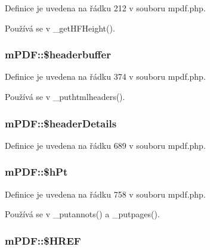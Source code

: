Definice je uvedena na řádku 212 v souboru mpdf.\-php.



Používá se v \-\_\-get\-H\-F\-Height().

\hypertarget{classm_p_d_f_ade2a892a970b5afb921da08cdeb1877e}{
\subsubsection[{\$headerbuffer}]{\setlength{\rightskip}{0pt plus 5cm}m\-P\-D\-F\-::\$headerbuffer}}\label{classm_p_d_f_ade2a892a970b5afb921da08cdeb1877e}


Definice je uvedena na řádku 374 v souboru mpdf.\-php.



Používá se v \-\_\-puthtmlheaders().

\hypertarget{classm_p_d_f_aa8fe296e3fda62d2f405586fe3185ab2}{
\subsubsection[{\$header\-Details}]{\setlength{\rightskip}{0pt plus 5cm}m\-P\-D\-F\-::\$header\-Details}}\label{classm_p_d_f_aa8fe296e3fda62d2f405586fe3185ab2}


Definice je uvedena na řádku 689 v souboru mpdf.\-php.

\hypertarget{classm_p_d_f_afdc888033e28d5153fd12bb7ac497e28}{
\subsubsection[{\$h\-Pt}]{\setlength{\rightskip}{0pt plus 5cm}m\-P\-D\-F\-::\$h\-Pt}}\label{classm_p_d_f_afdc888033e28d5153fd12bb7ac497e28}


Definice je uvedena na řádku 758 v souboru mpdf.\-php.



Používá se v \-\_\-putannots() a \-\_\-putpages().

\hypertarget{classm_p_d_f_af733c43571e0320a064d669903ecd89f}{
\subsubsection[{\$\-H\-R\-E\-F}]{\setlength{\rightskip}{0pt plus 5cm}m\-P\-D\-F\-::\$\-H\-R\-E\-F}}\label{classm_p_d_f_af733c43571e0320a064d669903ecd89f}


